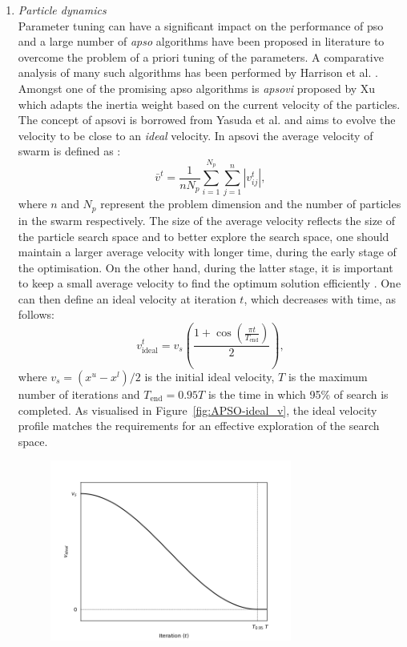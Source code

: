 \begin{enumerate}
		\item \emph{Particle dynamics}\\
			Parameter tuning can have a significant impact on the performance of \gls{pso} and a large number of \emph{\gls{apso}} algorithms have been proposed in literature to overcome the problem of a priori tuning of the parameters. A comparative analysis of many such algorithms has been performed by Harrison et al. \cite{Harrison:2018aa}. Amongst one of the promising \gls{apso} algorithms is \emph{\gls{apsovi}} proposed by Xu \cite{Xu:2013aa} which adapts the inertia weight based on the current velocity of the particles. The concept of \gls{apsovi} is borrowed from Yasuda et al. \cite{Yasuda:2008aa} and aims to evolve the velocity to be close to an \emph{ideal} velocity. In \gls{apsovi} the average velocity of swarm is defined as \cite{Xu:2013aa}:
			\begin{equation}
				\bar{v}^t = \frac{1}{n N_p} \sum_{i=1}^{N_p} \sum_{j=1}^{n} \left | v_{ij}^t \right |,
			\end{equation}
			where $n$ and $N_p$ represent the problem dimension and the number of particles in the swarm respectively. The size of the average velocity reflects the size of the particle search space and to better explore the search space, one should maintain a larger average velocity with longer time, during the early stage of the optimisation. On the other hand, during the latter stage, it is important to keep a small average velocity to find the optimum solution efficiently \cite{Xu:2013aa}. One can then define an ideal velocity at iteration $t$, which decreases with time, as follows:
			\begin{equation}
				{v}_\text{ideal}^t = v_s \left(\frac{1 + \cos\left (\frac{\pi t}{T_\text{end}} \right )}{2} \right),
			\end{equation}
			where $v_s = (x^u - x^l) / 2$ is the initial ideal velocity, $T$ is the maximum number of iterations and $T_\text{end} = 0.95 T$ is the time in which 95\% of search is completed. As visualised in Figure~\ref{fig:APSO-ideal_v}, the ideal velocity profile matches the requirements for an effective exploration of the search space.
			\begin{figure}[htbp]
				\centering
				\includegraphics[width=0.75\textwidth]{figures/chapter-6/APSO-VI}

\end{figure}
\end{enumerate}
